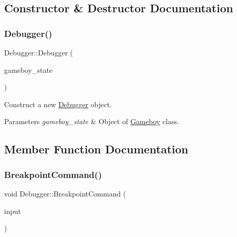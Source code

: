 \subsection{Constructor \& Destructor Documentation}
\mbox{\label{classDebugger_a75b2a03d64e618c422e5082b39c5dc73}} 
\subsubsection{\texorpdfstring{Debugger()}{Debugger()}}
{\footnotesize\ttfamily Debugger\+::\+Debugger (\begin{DoxyParamCaption}\item[{\mbox{\hyperlink{classGameboy}{Gameboy}} \&}]{gameboy\+\_\+state }\end{DoxyParamCaption})}



Construct a new \mbox{\hyperlink{classDebugger}{Debugger}} object. 


\begin{DoxyParams}{Parameters}
{\em gameboy\+\_\+state} & Object of \mbox{\hyperlink{classGameboy}{Gameboy}} class. \\
\hline
\end{DoxyParams}


\subsection{Member Function Documentation}
\mbox{\label{classDebugger_a6d57cbb879d3fdb6f000e220acd3623c}} 
\subsubsection{\texorpdfstring{Breakpoint\+Command()}{BreakpointCommand()}}
{\footnotesize\ttfamily void Debugger\+::\+Breakpoint\+Command (\begin{DoxyParamCaption}\item[{\mbox{\hyperlink{structDebuggerCommand}{Debugger\+Command}}}]{input }\end{DoxyParamCaption})\hspace{0.3cm}{\ttfamily [private]}}



